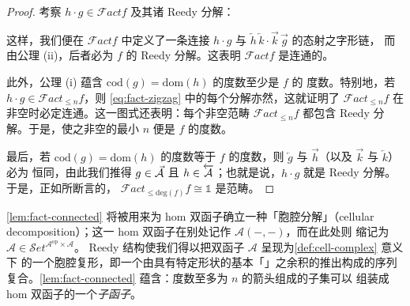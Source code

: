 \begin{proof}
考察 $h\cdot g\in\mathcal{F}act f$ 及其诸 Reedy 分解：
\begin{rveq}\label{eq:fact-zigzag}
\end{rveq}
这样，我们便在 $\mathcal{F}act f$ 中定义了一条连接 $h\cdot g$ 与
$\overleftarrow{h}\,\overleftarrow{k}\cdot\vec{k}\,\vec{g}$ 的态射之字形链，
而由公理 (ii)，后者必为 $f$ 的 Reedy 分解。这表明 $\mathcal{F}act f$ 是连通的。

此外，公理 (i) 蕴含 $\mathrm{cod}(g)=\mathrm{dom}(h)$ 的度数至少是 $f$ 的
度数。特别地，若 $h\cdot g\in\mathcal{F}act_{\leq n}f$，则
\eqref{eq:fact-zigzag} 中的每个分解亦然，这就证明了 $\mathcal{F}act_{\leq n}f$
在非空时必定连通。这一图式还表明：每个非空范畴 $\mathcal{F}act_{\leq n}f$
都包含 Reedy 分解。于是，使之非空的最小 $n$ 便是 $f$ 的度数。

最后，若 $\mathrm{cod}(g)=\mathrm{dom}(h)$ 的度数等于 $f$ 的度数，则
$\overleftarrow{g}$ 与 $\vec{h}$（以及 $\vec{k}$ 与 $\overleftarrow{k}$）必为
恒同，由此我们推得 $g\in\vec{\mathcal{A}}$ 且 $h\in\overleftarrow{\mathcal{A}}$；也就是说，$h\cdot g$ 就是
Reedy 分解。于是，正如所断言的，
$\mathcal{F}act_{\leq\mathrm{deg}(f)}f\cong\mathbb{1}$ 是\trTerminal{}范畴。
\end{proof}

\cref{lem:fact-connected} 将被用来为 hom 双函子确立一种「胞腔分解」（cellular
decomposition）；这一 hom 双函子在别处记作 $\mathcal{A}(-,-)$，而在此处则
缩记为 $\mathcal{A}\in\mathcal{S}et^{\mathcal{A}^{\mathrm{op}}\times\mathcal{A}}$。
Reedy 结构使我们得以把双函子 $\mathcal{A}$ 呈现为\cref{def:cell-complex} 意义下
的一个胞腔复形，即一个由具有特定形状的基本「\trCell{}」之余积的推出构成的序列
复合。\cref{lem:fact-connected} 蕴含：度数至多为 $n$ 的箭头组成的子集可以
组装成 hom 双函子的一个\emph{子函子}。

